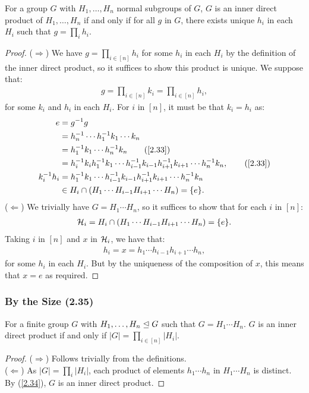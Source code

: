 For a group $G$ with $H_1, \ldots, H_n$ normal subgroups of $G$,
$G$ is an inner direct product of $H_1, \ldots, H_n$ if and
only if for all $g$ in $G$, there exists unique $h_i$ in each 
$H_i$ such that $g = \prod_ih_i$.

\begin{proof}
    ($\Longrightarrow$)
    We have $g = \prod_{i \in [n]} h_i$ for some $h_i$ in each $H_i$ by the definition of the inner
    direct product, so it suffices to show this product is unique. We suppose that: \begin{align*}
        g = \prod_{i \in [n]} k_i = \prod_{i \in [n]} h_i,
    \end{align*} for some $k_i$ and $h_i$ in each $H_i$. For $i$ in $[n]$, it must be
    that $k_i = h_i$ as: \begin{align*}
        e &= g^{-1}g \\
        &= h_n^{-1} \cdots h_1^{-1} k_1 \cdots k_n \\
        &= h_1^{-1}k_1 \cdots h_n^{-1}k_n \tag{\ref{2.33}} \\
        &= h_i^{-1}k_i h_1^{-1}k_1 \cdots 
            h_{i - 1}^{-1}k_{i - 1} h_{i + 1}^{-1}k_{i + 1} \cdots
            h_n^{-1}k_n, \tag{\ref{2.33}} \\
        k_i^{-1}h_i &= h_1^{-1}k_1 \cdots 
            h_{i - 1}^{-1}k_{i - 1} h_{i + 1}^{-1}k_{i + 1} \cdots
            h_n^{-1}k_n \\
        &\in H_i \cap (H_1 \cdots H_{i - 1}H_{i + 1} \cdots H_n) = \{e\}.
    \end{align*}
    ($\Longleftarrow$) We trivially have $G = H_1 \cdots H_n$, so it suffices to
    show that for each $i$ in $[n]$: \begin{align*}
        \mathcal{H}_i = H_i \cap (H_1 \cdots H_{i - 1}H_{i + 1} \cdots H_n) = \{e\}.
    \end{align*} Taking $i$ in $[n]$ and $x$ in $\mathcal{H}_i$, we have that: \begin{align*}
        h_i = x = h_1 \cdots h_{i - 1} h_{i + 1} \cdots h_n,
    \end{align*} for some $h_i$ in each $H_i$. But by the uniqueness of the composition 
    of $x$, this means that $x = e$ as required.
\end{proof} 

\subsubsection{By the Size (2.35)} \label{2.35}

For a finite group $G$ with $H_1, \ldots, H_n \trianglelefteq G$ such that
$G = H_1 \cdots H_n$. $G$ is an inner direct product if and only if
$|G| = \prod_{i \in [n]} |H_i|$.

\begin{proof}
    ($\Longrightarrow$) Follows trivially from the definitions.
    \\[\baselineskip]
    ($\Longleftarrow$) As $|G| = \prod_i |H_i|$, each product of elements $h_1 \cdots h_n$ 
    in $H_1 \cdots H_n$ is distinct. By (\ref{2.34}), $G$ is an inner direct product.
\end{proof}
